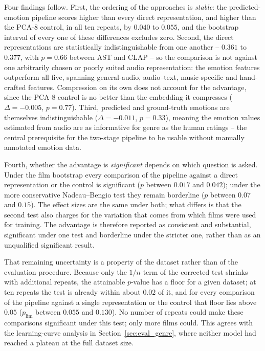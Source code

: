 Four findings follow. First, the ordering of the approaches is \emph{stable}: the
predicted-emotion pipeline scores higher than every direct representation, and higher
than the PCA-8 control, in all ten repeats, by $0.040$ to $0.055$, and the bootstrap
interval of every one of these differences excludes zero. Second, the direct
representations are statistically indistinguishable from one another -- $0.361$ to
$0.377$, with $p=0.66$ between AST and CLAP -- so the comparison is not against one
arbitrarily chosen or poorly suited audio representation: the emotion features outperform
all five, spanning general-audio, audio--text, music-specific and hand-crafted
features. Compression on its own does not account for the advantage, since the PCA-8
control is no better than the embedding it compresses ($\Delta=-0.005$, $p=0.77$).
Third, predicted and ground-truth emotions are themselves indistinguishable
($\Delta=-0.011$, $p=0.33$), meaning the emotion values estimated from audio are as
informative for genre as the human ratings -- the central prerequisite for the two-stage
pipeline to be usable without manually annotated emotion data.

Fourth, whether the advantage is \emph{significant} depends on which question is asked.
Under the film bootstrap every comparison of the pipeline against a direct representation
or the control is significant ($p$ between $0.017$ and $0.042$); under the more
conservative Nadeau--Bengio test they remain borderline ($p$ between $0.07$ and $0.15$).
The effect sizes are the same under both; what differs is that the second test also
charges for the variation that comes from which films were used for training. The
advantage is therefore reported as consistent and substantial, significant under one test
and borderline under the stricter one, rather than as an unqualified significant result.

That remaining uncertainty is a property of the dataset rather than of the evaluation
procedure. Because only the $1/n$ term of the corrected test shrinks with additional
repeats, the attainable $p$-value has a floor for a given dataset; at ten repeats the
test is already within about $0.02$ of it, and for every comparison of the pipeline
against a single representation or the control that floor lies above $0.05$
($p_{\lim}$ between $0.055$ and $0.130$). No number of repeats could make these
comparisons significant under this test; only more films could. This agrees with the
learning-curve analysis in Section~\ref{sec:eval_genre}, where neither model had
reached a plateau at the full dataset size.

